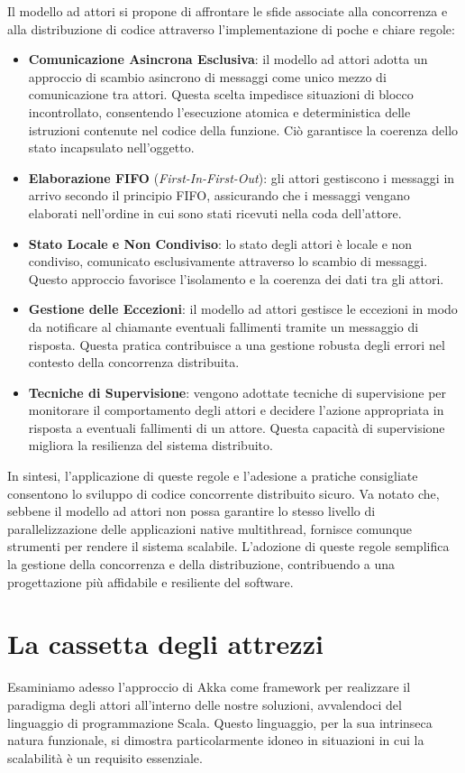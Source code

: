 Il modello ad attori si propone di affrontare le sfide associate alla concorrenza e alla distribuzione di codice attraverso l'implementazione di poche e chiare regole:
\begin{itemize}
  \item \textbf{Comunicazione Asincrona Esclusiva}: il modello ad attori adotta un approccio di scambio asincrono di messaggi come unico mezzo di comunicazione tra attori.
  Questa scelta impedisce situazioni di blocco incontrollato, consentendo l'esecuzione atomica e deterministica delle istruzioni contenute nel codice della funzione.
  Ciò garantisce la coerenza dello stato incapsulato nell'oggetto.
  \item \textbf{Elaborazione FIFO} (\textit{First-In-First-Out}): gli attori gestiscono i messaggi in arrivo secondo il principio FIFO, assicurando che i messaggi vengano elaborati nell'ordine in cui sono stati ricevuti nella coda dell'attore.
  \item \textbf{Stato Locale e Non Condiviso}: lo stato degli attori è locale e non condiviso, comunicato esclusivamente attraverso lo scambio di messaggi.
  Questo approccio favorisce l'isolamento e la coerenza dei dati tra gli attori.
  \item \textbf{Gestione delle Eccezioni}: il modello ad attori gestisce le eccezioni in modo da notificare al chiamante eventuali fallimenti tramite un messaggio di risposta.
  Questa pratica contribuisce a una gestione robusta degli errori nel contesto della concorrenza distribuita.
  \item \textbf{Tecniche di Supervisione}: vengono adottate tecniche di supervisione per monitorare il comportamento degli attori e decidere l'azione appropriata in risposta a eventuali fallimenti di un attore.
  Questa capacità di supervisione migliora la resilienza del sistema distribuito.
\end{itemize}
In sintesi, l'applicazione di queste regole e l'adesione a pratiche consigliate consentono lo sviluppo di codice concorrente distribuito sicuro.
Va notato che, sebbene il modello ad attori non possa garantire lo stesso livello di parallelizzazione delle applicazioni native multithread, fornisce comunque strumenti per rendere il sistema scalabile.
L'adozione di queste regole semplifica la gestione della concorrenza e della distribuzione, contribuendo a una progettazione più affidabile e resiliente del software.

\section[Cassetta degli attrezzi]{La cassetta degli attrezzi}
Esaminiamo adesso l'approccio di Akka come framework per realizzare il paradigma degli attori all'interno delle nostre soluzioni, avvalendoci del linguaggio di programmazione Scala. Questo linguaggio, per la sua intrinseca natura funzionale, si dimostra particolarmente idoneo in situazioni in cui la scalabilità è un requisito essenziale.

